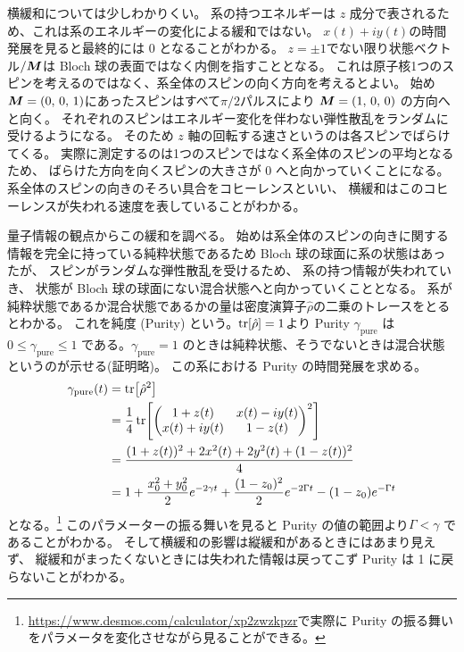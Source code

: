 \documentclass[11pt,dvipdfmx,a4paper]{jsarticle}
\begin{document}
横緩和については少しわかりくい。
系の持つエネルギーは \(z\) 成分で表されるため、これは系のエネルギーの変化による緩和ではない。
\(x(t) + iy(t)\)の時間発展を見ると最終的には 0 となることがわかる。
\(z = \pm 1\)でない限り状態ベクトル\(/\vb*{M}\)は Bloch 球の表面ではなく内側を指すこととなる。
これは原子核1つのスピンを考えるのではなく、系全体のスピンの向く方向を考えるとよい。
始め\(\vb*{M}=(0,\,0,\,1)\)にあったスピンはすべて\(\pi/2\)パルスにより
\(\vb*{M}=(1,\,0,\,0)\) の方向へと向く。
それぞれのスピンはエネルギー変化を伴わない弾性散乱をランダムに受けるようになる。
そのため \(z\) 軸の回転する速さというのは各スピンでばらけてくる。
実際に測定するのは1つのスピンではなく系全体のスピンの平均となるため、
ばらけた方向を向くスピンの大きさが 0 へと向かっていくことになる。
系全体のスピンの向きのそろい具合をコヒーレンスといい、
横緩和はこのコヒーレンスが失われる速度を表していることがわかる。

量子情報の観点からこの緩和を調べる。
始めは系全体のスピンの向きに関する情報を完全に持っている純粋状態であるため Bloch 球の球面に系の状態はあったが、
スピンがランダムな弾性散乱を受けるため、
系の持つ情報が失われていき、
状態が Bloch 球の球面にない混合状態へと向かっていくこととなる。
系が純粋状態であるか混合状態であるかの量は密度演算子\(\hat{\rho}\)の二乗のトレースをとるとわかる。
これを純度 (Purity) という。\(\tr[\hat{\rho}]=1\)より
 Purity \(\gamma_{\text{pure}}\) は\(0 \leq \gamma_{\text{pure}}\leq 1\)
である。\(\gamma_{\text{pure}} = 1\) のときは純粋状態、そうでないときは混合状態というのが示せる(証明略)。
この系における Purity の時間発展を求める。
\begin{align}
	\gamma_{\text{pure}}(t) &= \tr[\hat{\rho}^2] \notag\\
	&=\frac{1}{4}\tr[
		\begin{pmatrix}
			1 + z(t) & x(t)- iy(t)\\
			x(t) + iy(t) & 1 - z(t)
		\end{pmatrix}^2]\notag\\
	&=\frac{(1+z(t))^2+2x^2(t)+2y^2(t) + (1-z(t))^2}{4} \notag\\
	&=1 + \frac{x_0^2+y_0^2}{2}e^{-2\gamma t} +\frac{(1-z_0)^2}{2}e^{-2\Gamma t} - (1-z_0)e^{-\Gamma t}
\end{align}
となる。\footnote{\url{https://www.desmos.com/calculator/xp2zwzkpzr}で実際に Purity の振る舞いをパラメータを変化させながら見ることができる。}
このパラメーターの振る舞いを見ると Purity の値の範囲より\(\Gamma < \gamma\) であることがわかる。
そして横緩和の影響は縦緩和があるときにはあまり見えず、
縦緩和がまったくないときには失われた情報は戻ってこず Purity は 1 に戻らないことがわかる。
\end{document}

